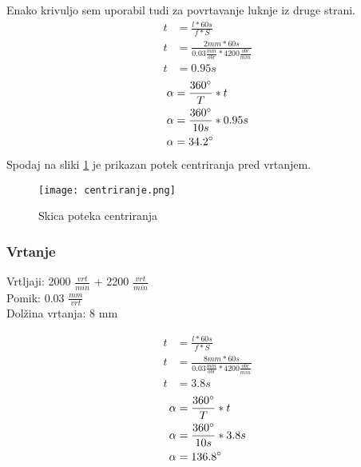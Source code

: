 Enako krivuljo sem uporabil tudi za povrtavanje luknje iz druge strani.
\begin{equation}
	\begin{split}
		t &= \frac{l*60s}{f*S} \\
		t &= \frac{2mm*60s}{0.03\frac{mm}{obr}*4200\frac{obr}{min}} \\
		t &= 0.95 s
	\end{split}
\end{equation}
\begin{equation}
	\begin{split}
		\alpha &= \frac{360\degree}{T} * t \\
		\alpha &= \frac{360\degree}{10s} * 0.95 s\\
		\alpha &= 34.2\degree
	\end{split}
\end{equation}
Spodaj na sliki \ref{centriranje} je prikazan potek
centriranja pred vrtanjem.

\begin{figure}[H]
	\begin{center}
		\texttt{[image: centriranje.png]}
		\caption{Skica poteka centriranja
			\cite{lasten}}
		\label{centriranje}
	\end{center}
\end{figure}


\subsubsection{Vrtanje}
Vrtljaji: 2000 \( \frac{vrt}{min} \) + 2200 \( \frac{vrt}{min} \)\\
Pomik: 0.03 \( \frac{mm}{vrt} \) \\
Dolžina vrtanja: 8 mm

\begin{equation}
	\begin{split}
		t &= \frac{l*60s}{f*S} \\
		t &= \frac{8mm*60s}{0.03\frac{mm}{obr}*4200\frac{obr}{min}} \\
		t &= 3.8 s
	\end{split}
\end{equation}
\begin{equation}
	\begin{split}
		\alpha &= \frac{360\degree}{T} * t \\
		\alpha &= \frac{360\degree}{10s} * 3.8 s\\
		\alpha &= 136.8\degree
	\end{split}
\end{equation}

